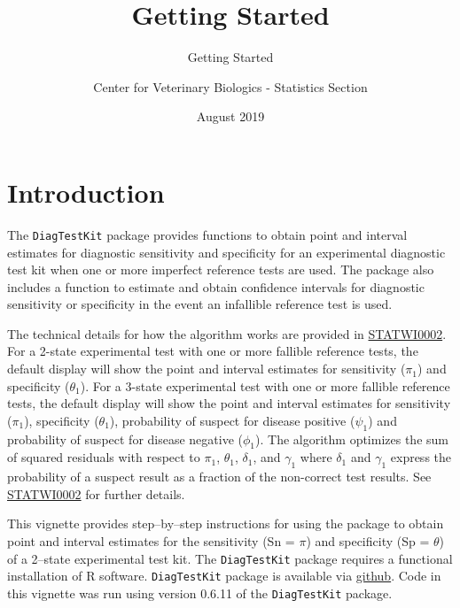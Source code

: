 \documentclass[
  12pt,
]{article}
\title{Getting Started}
\subtitle{Getting Started}
\author{Center for Veterinary Biologics - Statistics Section}
\date{August 2019}
\begin{document}
\maketitle

{
\hypersetup{linkcolor=}
\setcounter{tocdepth}{3}
\tableofcontents
}
\section{Introduction}\label{introduction}

The \texttt{DiagTestKit} package provides functions to obtain point and
interval estimates for diagnostic sensitivity and specificity for an
experimental diagnostic test kit when one or more imperfect reference
tests are used. The package also includes a function to estimate and
obtain confidence intervals for diagnostic sensitivity or specificity in
the event an infallible reference test is used.

The technical details for how the algorithm works are provided in
\href{https://www.aphis.usda.gov/aphis/ourfocus/animalhealth/veterinary-biologics/biologics-regulations-and-guidance/ct_vb_statwi}{STATWI0002}.
For a 2-state experimental test with one or more fallible reference
tests, the default display will show the point and interval estimates
for sensitivity (\(\pi_1\)) and specificity (\(\theta_1\)). For a
3-state experimental test with one or more fallible reference tests, the
default display will show the point and interval estimates for
sensitivity (\(\pi_1\)), specificity (\(\theta_1\)), probability of
suspect for disease positive (\(\psi_1\)) and probability of suspect for
disease negative (\(\phi_1\)). The algorithm optimizes the sum of
squared residuals with respect to \(\pi_1\), \(\theta_1\), \(\delta_1\),
and \(\gamma_1\) where \(\delta_1\) and \(\gamma_1\) express the
probability of a suspect result as a fraction of the non-correct test
results. See
\href{https://www.aphis.usda.gov/aphis/ourfocus/animalhealth/veterinary-biologics/biologics-regulations-and-guidance/ct_vb_statwi}{STATWI0002}
for further details.

This vignette provides step--by--step instructions for using the package
to obtain point and interval estimates for the sensitivity (Sn =
\(\pi\)) and specificity (Sp = \(\theta\)) of a 2--state experimental
test kit. The \texttt{DiagTestKit} package requires a functional
installation of R software. \texttt{DiagTestKit} package is available
via
\href{https://github.com/ABS-dev/DiagTestKit/blob/master/README.md}{github}.
Code in this vignette was run using version 0.6.11 of the
\texttt{DiagTestKit} package.
\end{document}
